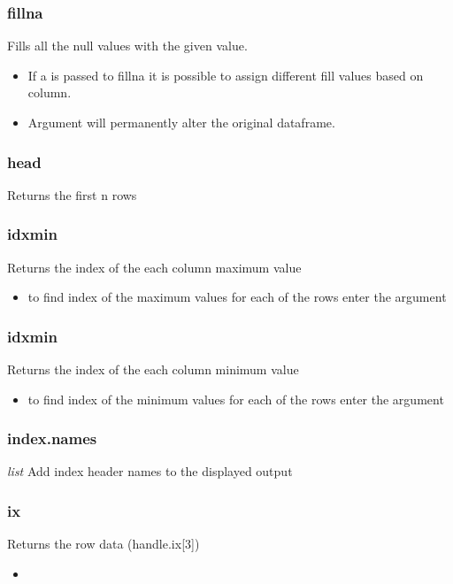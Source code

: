 %
\subsubsection{fillna}
Fills all the null values with the given value.
  \begin{itemize}

    \item If a {\color{red}{dictionary}} is passed to fillna it is possible
      to assign different fill values based on column.

    \item Argument {\color{red}{inplace=True}} will permanently alter the
      original dataframe.
  \end{itemize}

%
\subsubsection{head}
Returns the first n rows

%
\subsubsection{idxmin}
Returns the index of the each column maximum value
  \begin{itemize}

    \item to find index of the maximum values for each of the rows enter
      the argument \color{red}{axis=1}
  \end{itemize}

%
\subsubsection{idxmin}
Returns the index of the each column minimum value
  \begin{itemize}

    \item to find index of the minimum values for each of the rows enter
      the argument \color{red}{axis=1}
  \end{itemize}

%
\subsubsection{index.names}
\textit{list} Add index header names to the displayed output

%
\subsubsection{ix}
Returns the row data (handle.ix[3])
  \begin{itemize}

    \item \color{red}{if additional rows and columns are added using this
      command it will have the same effect as calling reindex.}
  \end{itemize}

